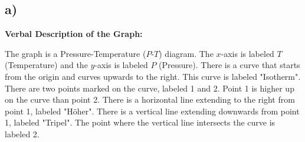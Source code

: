

\subsection*{a)}

\begin{center}
\textbf{Verbal Description of the Graph:}
\end{center}

The graph is a Pressure-Temperature ($P$-$T$) diagram. The $x$-axis is labeled $T$ (Temperature) and the $y$-axis is labeled $P$ (Pressure). There is a curve that starts from the origin and curves upwards to the right. This curve is labeled "Isotherm". There are two points marked on the curve, labeled 1 and 2. Point 1 is higher up on the curve than point 2. There is a horizontal line extending to the right from point 1, labeled "Höher". There is a vertical line extending downwards from point 1, labeled "Tripel". The point where the vertical line intersects the curve is labeled 2.